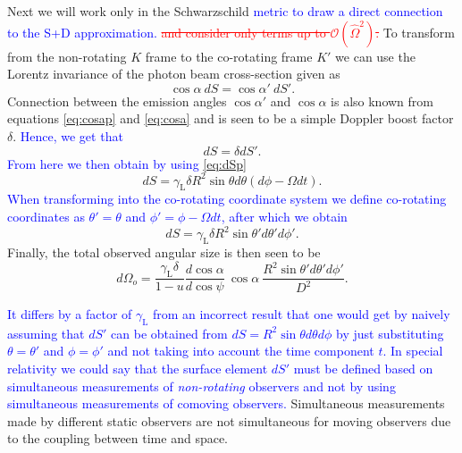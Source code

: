 \documentclass{aa}
\newcommand{\be}{\begin{equation}}
\newcommand{\ee}{\end{equation}}
\newcommand{\refe}[1]{\textcolor{blue}{{#1}}}
\newcommand{\refedel}[1]{\textcolor{red}{\sout{#1}}}
\newcommand{\sch}{Schwarzschild }
\newcommand{\Ob}{\ensuremath{\hat{\Omega}}}
\newcommand{\lgamma}{\gamma_{\text{L}}}
\begin{document}
Next we will work only in the \sch \refe{metric to draw a direct connection to the S+D approximation.} \refedel{and consider only terms up to $\mathcal{O}(\Ob^2)$.}
To transform from the non-rotating $K$ frame to the co-rotating frame $K'$ we can use the Lorentz invariance of the photon beam cross-section given as \citep{Terrell60, LB85}
\be
\cos\alpha ~dS = \cos\alpha' ~dS'.
\ee
Connection between the emission angles $\cos\alpha'$ and $\cos\alpha$ is also known from equations \eqref{eq:cosap} and \eqref{eq:cosa} and is seen to be a simple Doppler boost factor $\delta$.
\refe{Hence, we get that}
\be
dS = \delta dS'.
\ee
\refe{From here we then obtain by using \eqref{eq:dSp}}
\be
dS = \lgamma \delta R^2 \sin\theta d\theta (d\phi - \Omega dt).
\ee
\refe{When transforming into the co-rotating coordinate system we define co-rotating coordinates as $\theta' = \theta$ and $\phi' = \phi - \Omega dt$, after which we obtain}
\be
dS = \lgamma \delta R^2 \sin\theta' d\theta' d\phi'.
\ee
Finally, the total observed angular size is then seen to be 
\be
d\Omega_o = \frac{\lgamma \delta}{1-u} \frac{d \cos\alpha}{d \cos\psi} ~\cos\alpha ~ \frac{R^2 \sin\theta' d\theta' d\phi'}{D^2}.
\ee

\refe{It differs by a factor of $\lgamma$ from an incorrect result that one would get by naively assuming that $dS'$ can be obtained from $dS =R^2 \sin\theta d\theta d\phi$ by just substituting $\theta = \theta'$ and $\phi = \phi'$ and not taking into account the time component $t$.}
\refe{In special relativity we could say that the surface element $dS'$ must be defined based on simultaneous measurements of \textit{non-rotating} observers and not by using simultaneous measurements of comoving observers.}
Simultaneous measurements made by different static observers are not simultaneous for moving observers due to the coupling between time and space.
\end{document}
